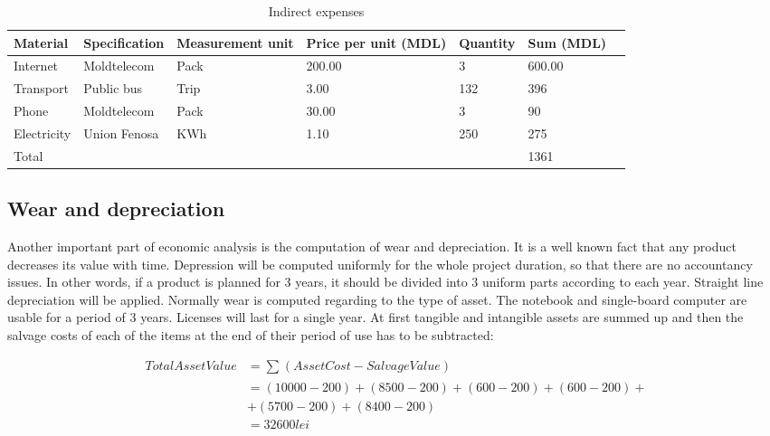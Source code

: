 \documentclass[12pt,a4paper]{report}
\begin{document}
\begin{table}[!h]
\begin{center}
\begin{tabularx}{\textwidth}{| M{5em} | Y | M{7em} | M{5em} | M{5em} | M{5em} |N}
\hline
\textbf{Material} & \textbf{Specification} & \textbf{Measurement unit} & \textbf{Price per unit (MDL)} & \textbf{Quantity} & \textbf{Sum (MDL)} &\\[18pt]
\hline
Internet & Moldtelecom & Pack & 200.00 & 3 & 600.00 &\\[14pt]
\hline
Transport & Public bus & Trip & 3.00 & 132 & 396 &\\[14pt]
\hline
Phone & Moldtelecom & Pack & 30.00 & 3 & 90 &\\[14pt]
\hline
Electricity & Union Fenosa & KWh & 1.10 & 250 & 275 &\\[14pt]
\hline
Total & & & & & 1361 &\\[14pt]
\hline
\end{tabularx}
\caption{Indirect expenses}
\label{table:indirect_expenses}
\end{center}
\end{table}

\subsection{Wear and depreciation}
Another important part of economic analysis is the computation of wear and depreciation. It is a well known fact that any product decreases its value with time. Depression will be computed uniformly for the whole project duration, so that there are no accountancy issues. In other words, if a product is planned for 3 years, it should be divided into 3 uniform parts according to each year. Straight line depreciation will be applied. Normally wear is computed regarding to the type of asset. The notebook and single-board computer are usable for a period of 3 years. Licenses will last for a single year. At first tangible and intangible assets are summed up and then the salvage costs of each of the items at the end of their period of use has to be subtracted:

\begin{equation}
 \begin{split}
  Total Asset Value &= \sum_{} (AssetCost - Salvage Value) \\
		    &= (10000 - 200) + (8500 - 200) + (600 - 200) + (600 - 200) +\\
		    & + (5700 - 200) + (8400 - 200) \\
		    &= 32600 lei
 \end{split}
\end{equation}
\end{document}

